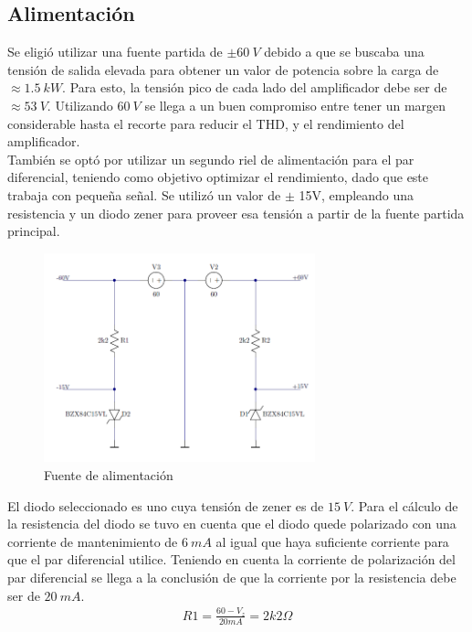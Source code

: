 
\subsection{Alimentación}
Se eligió utilizar una fuente partida de $\pm60 \ V$  debido a que se buscaba una tensión de salida elevada para obtener un valor de potencia sobre la carga de $\approx 1.5 \ kW$. Para esto, la tensión pico de cada lado del amplificador debe ser de $\approx 53 \ V$. Utilizando $60 \ V$ se llega a un buen compromiso entre tener un margen considerable hasta el recorte para reducir el THD, y el rendimiento del amplificador.\\ 
También se optó por utilizar un segundo riel de alimentación para el par diferencial, teniendo como objetivo optimizar el rendimiento, dado que este trabaja con pequeña señal. Se utilizó un valor de $\pm$ 15V, empleando una resistencia y un diodo zener para proveer esa tensión a partir de la fuente partida principal.
\begin{figure}[H]
\centeringfccc
	\includegraphics[width=0.7\textwidth]{ImagenesAlimentacion/al.png}
	\caption{Fuente de alimentación}
	\label{fig:alimentacion}
\end{figure}
El diodo seleccionado es uno cuya tensión de zener es de $15 \ V$.
Para el cálculo de la resistencia del diodo se tuvo en cuenta que el diodo quede polarizado con una corriente de mantenimiento de $6 \ mA$ al igual que haya suficiente corriente para que el par diferencial utilice. Teniendo en cuenta la corriente de polarización del par diferencial se llega a la conclusión de que la corriente por la resistencia debe ser de $20 \ mA$.
\begin{align}
R1=\frac{60-V_z}{20mA}= 2k2\Omega
\end{align}
